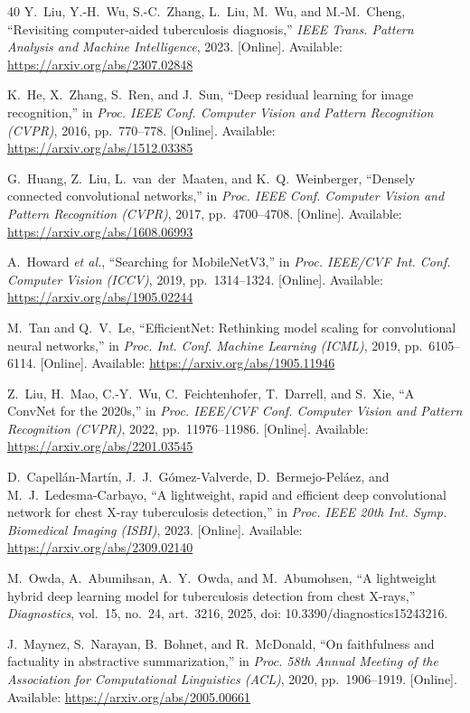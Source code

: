 \documentclass[conference, letterpaper]{IEEEtran}
\begin{document}
\begin{thebibliography}{40}
Y.~Liu, Y.-H.~Wu, S.-C.~Zhang, L.~Liu, M.~Wu, and M.-M.~Cheng, ``Revisiting computer-aided tuberculosis diagnosis,'' \textit{IEEE Trans. Pattern Analysis and Machine Intelligence}, 2023. [Online]. Available: \url{https://arxiv.org/abs/2307.02848}

K.~He, X.~Zhang, S.~Ren, and J.~Sun, ``Deep residual learning for image recognition,'' in \textit{Proc. IEEE Conf. Computer Vision and Pattern Recognition (CVPR)}, 2016, pp.~770--778. [Online]. Available: \url{https://arxiv.org/abs/1512.03385}

G.~Huang, Z.~Liu, L.~van~der~Maaten, and K.~Q.~Weinberger, ``Densely connected convolutional networks,'' in \textit{Proc. IEEE Conf. Computer Vision and Pattern Recognition (CVPR)}, 2017, pp.~4700--4708. [Online]. Available: \url{https://arxiv.org/abs/1608.06993}

A.~Howard \textit{et al.}, ``Searching for MobileNetV3,'' in \textit{Proc. IEEE/CVF Int. Conf. Computer Vision (ICCV)}, 2019, pp.~1314--1324. [Online]. Available: \url{https://arxiv.org/abs/1905.02244}

M.~Tan and Q.~V.~Le, ``EfficientNet: Rethinking model scaling for convolutional neural networks,'' in \textit{Proc. Int. Conf. Machine Learning (ICML)}, 2019, pp.~6105--6114. [Online]. Available: \url{https://arxiv.org/abs/1905.11946}

Z.~Liu, H.~Mao, C.-Y.~Wu, C.~Feichtenhofer, T.~Darrell, and S.~Xie, ``A ConvNet for the 2020s,'' in \textit{Proc. IEEE/CVF Conf. Computer Vision and Pattern Recognition (CVPR)}, 2022, pp.~11976--11986. [Online]. Available: \url{https://arxiv.org/abs/2201.03545}

D.~Capell\'{a}n-Mart\'{i}n, J.~J.~G\'{o}mez-Valverde, D.~Bermejo-Pel\'{a}ez, and M.~J.~Ledesma-Carbayo, ``A lightweight, rapid and efficient deep convolutional network for chest X-ray tuberculosis detection,'' in \textit{Proc. IEEE 20th Int. Symp. Biomedical Imaging (ISBI)}, 2023. [Online]. Available: \url{https://arxiv.org/abs/2309.02140}

M.~Owda, A.~Abumihsan, A.~Y.~Owda, and M.~Abumohsen, ``A lightweight hybrid deep learning model for tuberculosis detection from chest X-rays,'' \textit{Diagnostics}, vol.~15, no.~24, art.~3216, 2025, doi: 10.3390/diagnostics15243216.

J.~Maynez, S.~Narayan, B.~Bohnet, and R.~McDonald, ``On faithfulness and factuality in abstractive summarization,'' in \textit{Proc. 58th Annual Meeting of the Association for Computational Linguistics (ACL)}, 2020, pp.~1906--1919. [Online]. Available: \url{https://arxiv.org/abs/2005.00661}


\end{thebibliography}
\end{document}
